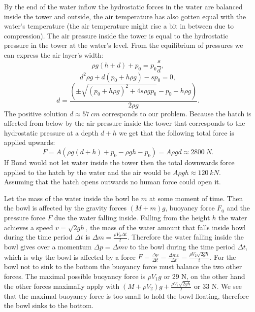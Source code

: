 \documentclass[11pt]{article}
\begin{document}

\solueng
By the end of the water inflow the hydrostatic forces in the water are balanced inside the tower and outside, the air temperature has also gotten equal with the water’s temperature (the air temperature might rise a bit in between due to compression). The air pressure inside the tower is equal to the hydrostatic pressure in the tower at the water’s level. From the equilibrium of pressures we can express the air layer’s width:
$$ \rho g (h+d) + p_0 = p_0 \frac{s}{d},$$
$$ d^2 \rho g  + d (p_0 + h \rho g) - s p_0=0, $$
$$ d = \frac{( \pm \sqrt{(p_0 + h \rho g)^2 + 4 s \rho g p_0 } - p_0 - h \rho g)}{2\rho g }.$$
The positive solution $d \approx \SI{57}{cm}$ corresponds to our problem. Because the hatch is affected from below by the air pressure inside the tower that corresponds to the hydrostatic pressure at a depth $d+h$ we get that the following total force is applied upwards:
$$F = A(\rho g (d+h) + p_0 - \rho g h - p_0) = A \rho g d \approx \SI{2800}{N}.  $$
If Bond would not let water inside the tower then the total downwards force applied to the hatch by the water and the air would be $A \rho g h \approx \SI{120}{kN}$. Assuming that the hatch opens outwards no human force could open it.
\probend
\bigskip


\solueng
Let the mass of the water inside the bowl be $m$ at some moment of time. Then the bowl is affected by the gravity forces $(M+m)g$, buoyancy force $F_{ü}$ and the pressure force $F$ due the water falling inside. Falling from the height $h$ the water achieves a speed $v=\sqrt{2gh}$, the mass of the water amount that falls inside bowl during the time period $\Delta t$ is $\Delta m = \frac{\rho V_2 \Delta t}{t}$. Therefore the water falling inside the bowl gives over a momentum $\Delta p =\Delta m v$ to the bowl during the time period $\Delta t$, which is why the bowl is affected by a force $F=\frac{\Delta p}{\Delta t}=\frac{\Delta m v}{\Delta t}=\frac{\rho V_2 \sqrt{2gh}}{t}$. For the bowl not to sink to the bottom the buoyancy force must balance the two other forces. The maximal possible buoyancy force is $\rho V_1 g$ or 29 N, on the other hand the other forces maximally apply with $(M+\rho V_2)g + \frac{\rho V_2 \sqrt{2gh}}{t}$ or 33 N. We see that the maximal buoyancy force is too small to hold the bowl floating, therefore the bowl sinks to the bottom.
\probend
\bigskip
\end{document}
